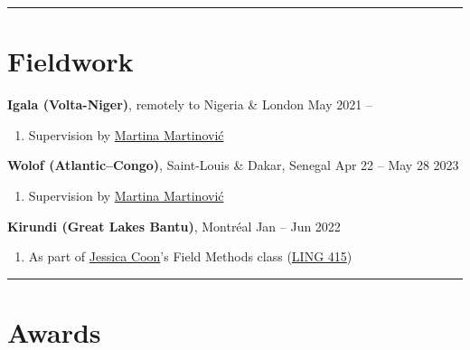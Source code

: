 \documentclass[margin,line]{resume}
\begin{document}
\begin{resume}
\begin{comment}
	\textbf{Junior Developer}, \href{https://gls-canada.com/en/dicom/corp/home}{GLS (\textit{fka} Dicom)}, Montréal \hfill Jan -- May 2019
	\begin{enumerate}[-, leftmargin=1em, topsep=4pt]
		\item[] Worked on \href{https://gls-canada.com/en/dicom/about-us/news/dicom-launches-smart4-shipping}{smart4 shipping platform} back-end
	\end{enumerate}
	\end{comment}

	\vspace{-0.9em}\rule{\textwidth}{0.4pt}



	\section{\mysidestyle Fieldwork}

	\textbf{Igala (Volta-Niger)}, remotely to Nigeria \& London \hfill May 2021 --
	\begin{enumerate}[-, leftmargin=1em, topsep=4pt]
		\item[] Supervision by \href{https://inamartinovic.com/}{Martina Martinović}
	\end{enumerate}


	\textbf{Wolof (Atlantic–Congo)}, Saint-Louis \& Dakar, Senegal \hfill Apr 22 -- May 28 2023
	\begin{enumerate}[-, leftmargin=1em, topsep=4pt]
		\item[] Supervision by \href{https://inamartinovic.com/}{Martina Martinović}
	\end{enumerate}

	\textbf{Kirundi (Great Lakes Bantu)}, Montréal \hfill Jan -- Jun 2022
	\begin{enumerate}[-, leftmargin=1em, topsep=4pt]
		\item[] As part of \href{https://jessica.lingspace.org/}{Jessica Coon}'s Field Methods class (\href{https://www.mcgill.ca/study/2021-2022/courses/ling-415}{LING 415})
	\end{enumerate}

	\vspace{-0.9em}\rule{\textwidth}{0.4pt}


	\section{\mysidestyle Awards}


\end{resume}
\end{document}
